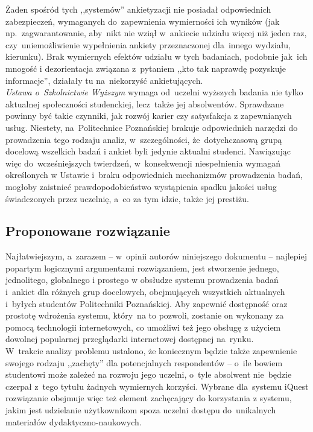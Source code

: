 Żaden spośród tych ,,systemów'' ankietyzacji nie posiadał odpowiednich zabezpieczeń, wymaganych do~zapewnienia wymierności ich wyników (jak np.~zagwarantowanie, aby~nikt nie wziął w~ankiecie udziału więcej niż jeden raz, czy~uniemożliwienie wypełnienia ankiety przeznaczonej dla~innego wydziału, kierunku). Brak wymiernych efektów udziału w tych badaniach, podobnie jak~ich mnogość i dezorientacja związana z~pytaniem ,,kto tak naprawdę pozyskuje informacje'', działały tu na~niekorzyść ankietujących. \\

\textit{Ustawa o~Szkolnictwie Wyższym} wymaga od~uczelni wyższych badania nie tylko aktualnej społeczności studenckiej, lecz~także jej absolwentów\cite{AP:PoSW05}. Sprawdzane powinny być takie czynniki, jak rozwój karier czy satysfakcja z zapewnianych usług. Niestety, na~Politechnice Poznańskiej brakuje odpowiednich narzędzi do prowadzenia tego rodzaju analiz, w~szczególności, że~dotychczasową grupą docelową wszelkich badań i ankiet byli jedynie aktualni studenci. Nawiązując więc do~wcześniejszych twierdzeń, w~konsekwencji niespełnienia wymagań określonych w Ustawie i~braku odpowiednich mechanizmów prowadzenia badań, mogłoby zaistnieć prawdopodobieństwo wystąpienia spadku jakości usług świadczonych przez uczelnię, a~co za tym idzie, także jej prestiżu.

\subsection{Proponowane rozwiązanie}
\label{Chapter112}

Najłatwiejszym, a~zarazem -- w~opinii autorów niniejszego dokumentu -- najlepiej popartym logicznymi argumentami rozwiązaniem, jest stworzenie jednego, jednolitego, globalnego i prostego w obsłudze systemu prowadzenia badań i~ankiet dla różnych grup docelowych, obejmujących wszystkich aktualnych i~byłych studentów Politechniki Poznańskiej. Aby zapewnić dostępność oraz prostotę wdrożenia systemu, który~na to pozwoli, zostanie on wykonany za pomocą technologii internetowych, co umożliwi też jego obsługę z użyciem dowolnej popularnej przeglądarki internetowej dostępnej na~rynku. \\

W~trakcie analizy problemu ustalono, że koniecznym będzie także zapewnienie swojego rodzaju ,,zachęty'' dla potencjalnych respondentów -- o~ile bowiem studentowi może zależeć na rozwoju jego uczelni, o~tyle absolwent nie~będzie czerpał z~tego tytułu żadnych wymiernych korzyści. Wybrane dla~systemu iQuest rozwiązanie obejmuje więc też element zachęcający do korzystania z systemu, jakim jest udzielanie użytkownikom spoza uczelni dostępu do~unikalnych materiałów dydaktyczno-naukowych. \\


